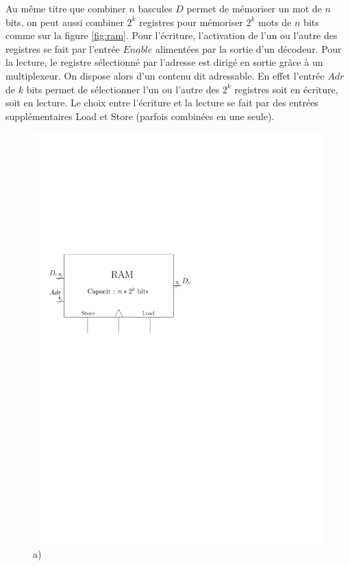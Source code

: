 Au même titre que combiner $n$ bascules $D$ permet de mémoriser un mot de $n$ bits, on peut aussi combiner $2^k$ registres pour mémoriser $2^k$ mots de $n$ bits comme sur la figure \ref{fig:ram}. Pour l'écriture, l'activation de l'un ou l'autre des registres se fait par l'entrée $Enable$ alimentées par la sortie d'un décodeur. Pour la lecture, le registre sélectionné par l'adresse est dirigé en sortie grâce à un multiplexeur. On dispose alors d'un contenu dit adressable. En effet l'entrée $Adr$ de $k$ bits permet de sélectionner l'un ou l'autre des $2^k$ registres soit en écriture, soit en lecture. Le choix entre l'écriture et la lecture se fait par des entrées supplémentaires Load et Store (parfois combinées en une seule).

\begin{figure}[htbp]
   \begin{minipage}[c]{.4\linewidth}
\includegraphics[width=\columnwidth]{Figs/ram.pdf}\\\centering a)

\end{minipage}
\end{figure}
